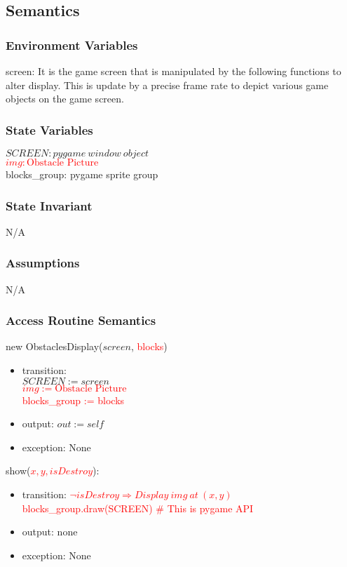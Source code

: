 \documentclass[12pt]{article}
\begin{document}
\subsection*{Semantics}
\subsubsection*{Environment Variables}
screen: It is the game screen that is manipulated by the following functions to alter display. This is update by a precise frame rate to depict various game objects on the game screen.
\subsubsection*{State Variables}
$SCREEN: pygame\ window\ object$\\
\textcolor{red}{\st{$img: \text{Obstacle Picture}$}}\\
blocks\_group: pygame sprite group
\subsubsection*{State Invariant}
N/A
\subsubsection*{Assumptions}
N/A
\subsubsection*{Access Routine Semantics}

new ObstaclesDisplay($screen$, \textcolor{red}{blocks})
\begin{itemize}
    \item transition: \\
    $SCREEN := screen$\\
    \textcolor{red}{\st{$img := \text{Obstacle Picture}$}}\\
    \textcolor{red}{blocks\_group := blocks}
    \item output: $out := self$
    \item exception: None
\end{itemize}

\noindent show(\textcolor{red}{\st{$x, y, isDestroy$}}):
\begin{itemize}
    \item transition: \textcolor{red}{\st{$\lnot isDestroy \Rightarrow Display\ img\ at\ (x, y)$}}\\
    \textcolor{red}{blocks\_group.draw(SCREEN) \# This is pygame API}
    
    \item output: none
    \item exception: None
\end{itemize}
\newpage
\end{document}
